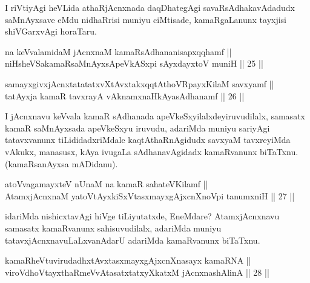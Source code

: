 \begin{artha}
I riVtiyAgi heVLida athaRjAcnxnada daqDhategAgi savaRsAdhakavAdadudx saMnAyxsave eMdu nidhaRrisi muniyu ciMtisade, kamaRgaLanunx tayxjisi shiVGarxvAgi horaTaru.
\end{artha}


\begin{shl}
na keVvalamidaM jAcnxnaM kamaRsAdhananisapxqqhamf || \\
niHsheVSakamaRsaMnAyxsApeVkASx\s pi sAyxdayxtoV muniH \hfill || 25 || 
\end{shl}
				
\begin{shl}
samayxgivxjAcnxtatatatxvXtAvxtakxqqtAthoVR\s payxKilaM savxyamf || \\
tatAyxja kamaR tavxrayA vAknamxnaHkAyasAdhanamf \hfill || 26 ||  
\end{shl}

\begin{artha}
I jAcnxnavu keVvala kamaR sAdhanada apeVkeSxyilalxdeyiruvudilalx, samasatx kamaR saMnAyxsada apeVkeSxyu iruvudu, adariMda muniyu sariyAgi tatavxvanunx tiLididadxriMdale kaqtAthaRnAgidudx savxyaM tavxreyiMda vAkukx, manasusx, kAya ivugaLa sAdhanavAgidadx kamaRvanunx biTaTxnu. (kamaRsanAyxsa mADidanu).
\end{artha}


\begin{shl}
atoV\s vagamayxteV nUnaM na kamaR sahateV\s Kilamf || \\
AtamxjAcnxnaM yatoV\s tAyxkiSxVtasxmayxgAjxcnXnoV\s pi tanumxniH \hfill || 27 ||  
\end{shl}

\begin{artha}
idariMda nishicxtavAgi hiVge tiLiyutatxde, EneMdare? AtamxjAcnxnavu samasatx kamaRvanunx sahisuvudilalx, adariMda muniyu tatavxjAcnxnavuLaLxvanAdarU adariMda kamaRvanunx biTaTxnu.
\end{artha}


\begin{shl}
kamaRheVtuvirudadhxtAvxtasxmayxgAjxcnXnasayx kamaRNA || \\
viroVdhoV\s tayxthaRmeVvAtasatxtatxyXkatxM jAcnxnashAlinA \hfill || 28 ||  
\end{shl}


